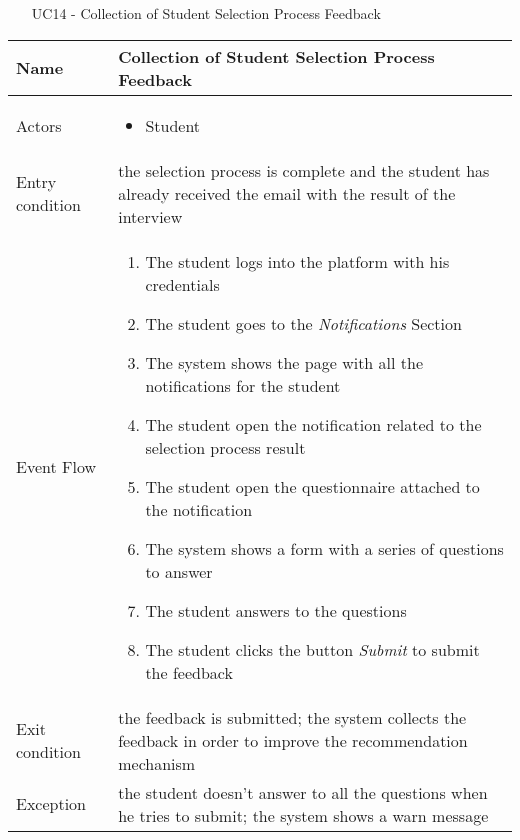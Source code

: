 				
				\begin{table} [H]
					\centering
					\begin{itemize}
						\item [UC14] - Collection of Student Selection Process Feedback
					\end{itemize}
					
					\begin{tabular}{|| P{7.5cm} | P{7.5cm} ||}
						\hline
						Name & Collection of Student Selection Process Feedback \\
						\hline
						Actors & \parbox{5cm}{\begin{itemize}
								\item Student
							\end{itemize}
						} \\
						\hline
						Entry condition & the selection process is complete and the student has already received the email with the result of the interview \\
						\hline
						Event Flow & \parbox{5cm}{\begin{enumerate}
								\item The student logs into the platform with his credentials
								\item The student goes to the \textit{Notifications} Section
								\item The system shows the page with all the notifications for the student
								\item The student open the notification related to the selection process result 
								\item The student open the questionnaire attached to the notification
								\item The system shows a form with a series of questions to answer
								\item The student answers to the questions 
								\item The student clicks the button \textit{Submit} to submit the feedback
						\end{enumerate}} \\
						\hline 
						Exit condition & the feedback is submitted; the system collects the feedback in order to improve the recommendation 
						mechanism \\
						\hline
						Exception & the student doesn't answer to all the questions when he tries to submit; the system shows a warn message \\
						\hline
					\end{tabular}
				\end{table}
				
